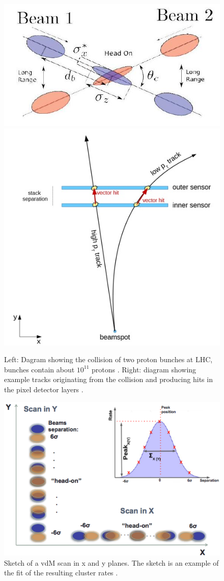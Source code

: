 \documentclass[final,12p]{article}
\begin{document}
\begin{figure}[H]
  \centering
  \includegraphics[width=0.48\columnwidth]{./bunchcrossing.jpg}
  \includegraphics[width=0.42\columnwidth]{./vectorhit1.jpg}
  \caption{
    Left: Dagram showing the collision of two proton bunches at LHC, bunches contain about $10^{11}$ protons  \cite{deMaria:2008zzb}.
    Right: diagram showing example tracks originating from the collision and producing hits in the pixel detector layers \cite{Thomsom}.
  }
  \label{fig:bunchcrossing}
\end{figure}


\begin{figure}[H]
  \centering
  \includegraphics[width=0.7\columnwidth]{./vdm_sketch.png}
  \caption{
   Sketch of a vdM scan in x and y planes. The sketch is an example of
the fit of the resulting cluster rates \cite{vdMSketch}.
  }
  \label{vdMSketch}
\end{figure}
\end{document}
